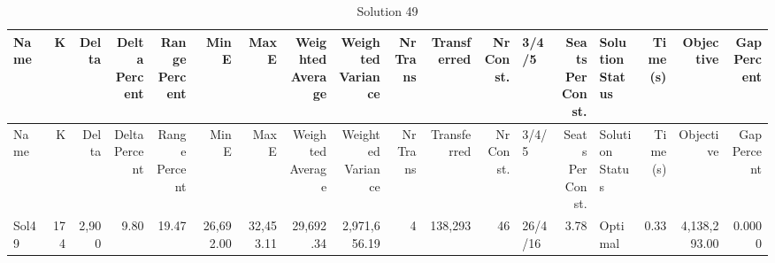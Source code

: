 \documentclass[a4paper]{article}
\begin{document}
{\scriptsize
\begin{longtable}{lrrrrrrrrrrrlrlrrr}
\caption{Solution 49}
\\ \toprule
Name &K &Delta &\shortstack{Delta\\Percent} &\shortstack{Range\\Percent} &Min E &Max E &\shortstack{Weighted\\Average} &\shortstack{Weighted\\Variance} &\shortstack{Nr\\Trans} &Transferred &\shortstack{Nr\\Const.} &3/4/5 &\shortstack{Seats\\Per\\Const.} &\shortstack{Solution\\Status} &\shortstack{Time\\(s)} &Objective &\shortstack{Gap\\Percent} \\ \midrule
\endfirsthead
\toprule
Name &K &Delta &\shortstack{Delta\\Percent} &\shortstack{Range\\Percent} &Min E &Max E &\shortstack{Weighted\\Average} &\shortstack{Weighted\\Variance} &\shortstack{Nr\\Trans} &Transferred &\shortstack{Nr\\Const.} &3/4/5 &\shortstack{Seats\\Per\\Const.} &\shortstack{Solution\\Status} &\shortstack{Time\\(s)} &Objective &\shortstack{Gap\\Percent} \\ \midrule
\endhead
\bottomrule
\endfoot
Sol49&174&2,900& 9.80&19.47&26,692.00&32,453.11&29,692.34&2,971,656.19&4&138,293&46&26/4/16& 3.78&Optimal& 0.33&4,138,293.00&0.0000\\ 
\end{longtable}

}
\end{document}
